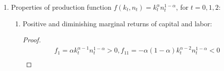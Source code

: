 \documentclass{article}
\begin{document}
\begin{enumerate}
\begin{enumerate}
\begin{enumerate}
\begin{equation*}
\begin{aligned}
                    &n_t\ge0,\text{ for }t=0,1,2\\
                    &1-n_t\ge0,\text{ for }t=0,1,2\\
                    &c_t\ge0,\text{ for }t=0,1,2
                \end{aligned}\right.
            \end{equation*}
            \item Multipliers are non-negative:
            \begin{equation*}
                \left\{\begin{aligned}
                    &\lambda_t\ge0,\text{ for }t=0,1,2\\
                    &\mu_t\ge0,\text{ for }t=0,1,2\\
                    &\theta_t\ge0,\text{ for }t=0,1,2\\
                    &\eta_t\ge0,\text{ for }t=0,1,2\\
                    &\nu_t\ge0,\text{ for }t=0,1,2
                \end{aligned}\right.
            \end{equation*}
            \item Complementary Slackness:
            \begin{equation*}
                \left\{\begin{aligned}
                    &\mu_tk_{t+1}=0,\text{ for }t=0,1,2\\
                    &\theta_tn_t=0,\text{ for }t=0,1,2\\
                    &\eta_t(1-n_t)=0,\text{ for }t=0,1,2\\
                    &\nu_tc_t=0,\text{ for }t=0,1,2
                \end{aligned}\right.
            \end{equation*}
        \end{enumerate}
        \item Properties of production function $f(k_t,n_t)=k_t^\alpha n_t^{1-\alpha}$, for $t=0,1,2$:
        \begin{enumerate}
            \item Positive and diminishing marginal returns of capital and labor:
            \begin{proof}
                \begin{align*}
                    &f_1=\alpha k_t^{\alpha-1}n_t^{1-\alpha}>0,f_{11}=-\alpha(1-\alpha)k_t^{\alpha-2}n_t^{1-\alpha}<0\\

\end{align*}
\end{proof}
\end{enumerate}
\end{enumerate}
\end{enumerate}
\end{document}
